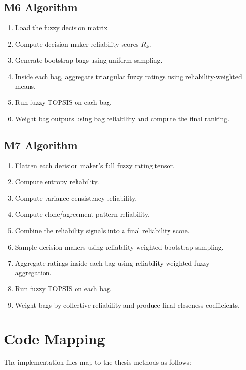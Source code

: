 \subsection{M6 Algorithm}

\begin{enumerate}
    \item Load the fuzzy decision matrix.
    \item Compute decision-maker reliability scores \(R_k\).
    \item Generate bootstrap bags using uniform sampling.
    \item Inside each bag, aggregate triangular fuzzy ratings using reliability-weighted means.
    \item Run fuzzy TOPSIS on each bag.
    \item Weight bag outputs using bag reliability and compute the final ranking.
\end{enumerate}

\subsection{M7 Algorithm}

\begin{enumerate}
    \item Flatten each decision maker's full fuzzy rating tensor.
    \item Compute entropy reliability.
    \item Compute variance-consistency reliability.
    \item Compute clone/agreement-pattern reliability.
    \item Combine the reliability signals into a final reliability score.
    \item Sample decision makers using reliability-weighted bootstrap sampling.
    \item Aggregate ratings inside each bag using reliability-weighted fuzzy aggregation.
    \item Run fuzzy TOPSIS on each bag.
    \item Weight bags by collective reliability and produce final closeness coefficients.
\end{enumerate}

\section{Code Mapping}

The implementation files map to the thesis methods as follows:

